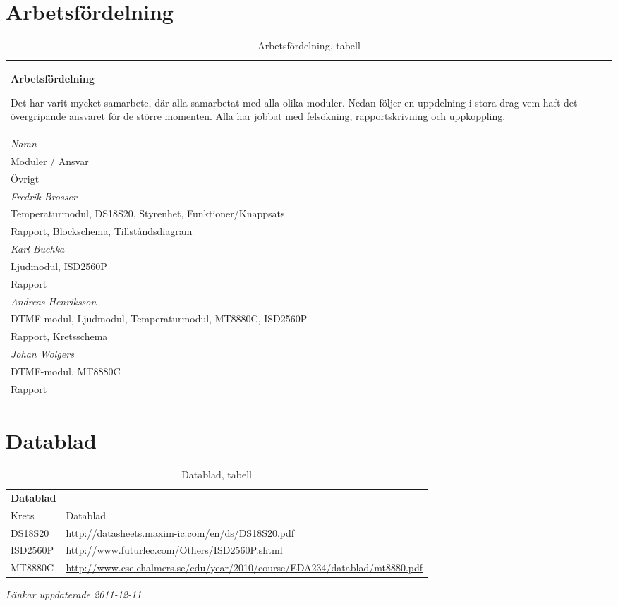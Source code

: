\documentclass[a4paper,11pt]{article}
\begin{document}
	\section{Arbetsfördelning}
	\label{sec:arbetsSec}
	\begin{table} [H]
	\caption{Arbetsfördelning, tabell} 
	\label{tab:arbetsTabell}

		\begin{tabular}{l l l}
		{\bf Arbetsfördelning}
		
		Det har varit mycket samarbete, där alla samarbetat med alla olika moduler. Nedan följer en uppdelning
		i stora drag vem haft det övergripande ansvaret för de större momenten. Alla har jobbat med felsökning,
		rapportskrivning och uppkoppling.
		
		\\{\it Namn} \\ {Moduler / Ansvar} \\ {Övrigt}\\
		\hline
				{\it Fredrik Brosser}\\
				 Temperaturmodul, DS18S20, Styrenhet, Funktioner/Knappsats\\
				 Rapport, Blockschema, Tillståndsdiagram\\
				{\it Karl Buchka}\\
				 Ljudmodul, ISD2560P\\
				 Rapport\\
				{\it Andreas Henriksson}\\
				 DTMF-modul, Ljudmodul, Temperaturmodul, MT8880C, ISD2560P\\
				 Rapport, Kretsschema\\
				{\it Johan Wolgers}\\
				 DTMF-modul, MT8880C\\
				 Rapport\\
		\end{tabular}
	\end{table}
		
	\section{Datablad}
	
	\label{sec:datablad}
	
	\begin{table} [H]
	\caption{Datablad, tabell} 
	\label{tab:databladsTabell}

		\begin{tabular}{l l}
		{\bf Datablad}
		\\{Krets} & {Datablad}\\
		\hline
			DS18S20 	& {\small \url{http://datasheets.maxim-ic.com/en/ds/DS18S20.pdf}}\\
			ISD2560P 	& {\small \url{http://www.futurlec.com/Others/ISD2560P.shtml}}\\
			MT8880C 	& {\small \url{http://www.cse.chalmers.se/edu/year/2010/course/EDA234/datablad/mt8880.pdf}}\\
		\end{tabular}
		{\it Länkar uppdaterade 2011-12-11}
	\end{table}
\end{document}
